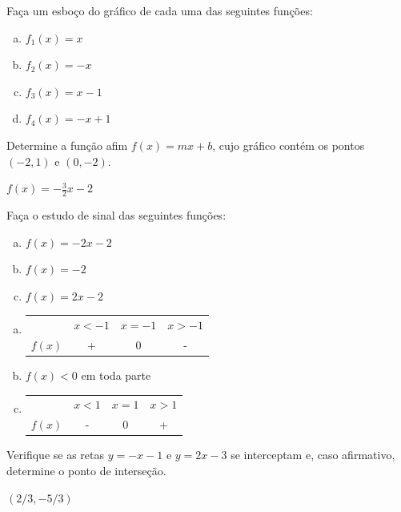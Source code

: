 \begin{exer}
  Faça um esboço do gráfico de cada uma das seguintes funções:
  \begin{enumerate}[a)]
  \item $f_1(x) = x$
  \item $f_2(x) = -x$
  \item $f_3(x) = x-1$
  \item $f_4(x) = -x+1$
  \end{enumerate}
\end{exer}

\begin{exer}
  Determine a função afim $f(x)=mx+b$, cujo gráfico contém os pontos $(-2, 1)$ e $(0, -2)$.
\end{exer}
\begin{resp}
  $f(x) = -\frac{3}{2}x - 2$
\end{resp}

\begin{exer}
  Faça o estudo de sinal das seguintes funções:
  \begin{enumerate}[a)]
  \item $f(x) = -2x - 2$
  \item $f(x) = -2$
  \item $f(x) = 2x - 2$
  \end{enumerate}
\end{exer}
\begin{resp}
  \begin{enumerate}[a)]
  \item
    \begin{tabular}{lccc}
      & $x<-1$ & $x=-1$ & $x>-1$\\
      $f(x)$ & + & 0 & -
    \end{tabular}
  \item $f(x)<0$ em toda parte
  \item 
    \begin{tabular}{lccc}
      & $x<1$ & $x=1$ & $x>1$\\
      $f(x)$ & - & 0 & +
    \end{tabular}
  \end{enumerate}
\end{resp}

\begin{exer}
  Verifique se as retas $y = -x - 1$ e $y = 2x - 3$ se interceptam e, caso afirmativo, determine o ponto de interseção.
\end{exer}
\begin{resp}
  $(2/3,-5/3)$
\end{resp}

